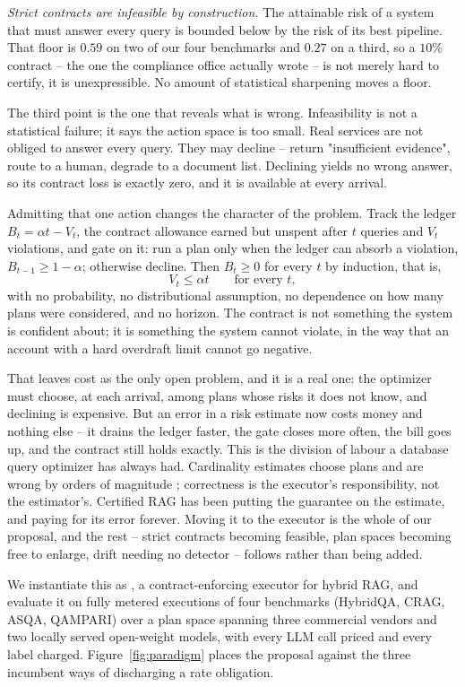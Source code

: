 \emph{Strict contracts are infeasible by construction.} The attainable
risk of a system that must answer every query is bounded below by the
risk of its best pipeline. That floor is $0.59$ on two of our four
benchmarks and $0.27$ on a third, so a $10\%$ contract -- the one the
compliance office actually wrote -- is not merely hard to certify, it is
unexpressible. No amount of statistical sharpening moves a floor.

The third point is the one that reveals what is wrong. Infeasibility is
not a statistical failure; it says the action space is too small. Real
services are not obliged to answer every query. They may decline --
return "insufficient evidence", route to a human, degrade to a document
list. Declining yields no wrong answer, so its contract loss is exactly
zero, and it is available at every arrival.

Admitting that one action changes the character of the problem. Track
the ledger $B_t = \alpha t - V_t$, the contract allowance earned but
unspent after $t$ queries and $V_t$ violations, and gate on it: run a
plan only when the ledger can absorb a violation, $B_{t-1} \ge
1-\alpha$; otherwise decline. Then $B_t \ge 0$ for every $t$ by
induction, that is,
\[
V_t \le \alpha t \qquad \text{for every } t,
\]
with no probability, no distributional assumption, no dependence on how
many plans were considered, and no horizon. The contract is not
something the system is confident about; it is something the system
cannot violate, in the way that an account with a hard overdraft limit
cannot go negative.

That leaves cost as the only open problem, and it is a real one: the
optimizer must choose, at each arrival, among plans whose risks it does
not know, and declining is expensive. But an error in a risk estimate
now costs money and nothing else -- it drains the ledger faster, the
gate closes more often, the bill goes up, and the contract still holds
exactly. This is the division of labour a database query optimizer has
always had. Cardinality estimates choose plans and are wrong by orders
of magnitude \citep{leis2015good}; correctness is the executor's
responsibility, not the estimator's. Certified RAG has been putting the
guarantee on the estimate, and paying for its error forever. Moving it
to the executor is the whole of our proposal, and the rest -- strict
contracts becoming feasible, plan spaces becoming free to enlarge,
drift needing no detector -- follows rather than being added.

We instantiate this as \system, a contract-enforcing executor for
hybrid RAG, and evaluate it on fully metered executions of four
benchmarks (HybridQA, CRAG, ASQA, QAMPARI) over a plan space spanning
three commercial vendors and two locally served open-weight models,
with every LLM call priced and every label charged.
Figure~\ref{fig:paradigm} places the proposal against the three
incumbent ways of discharging a rate obligation.

